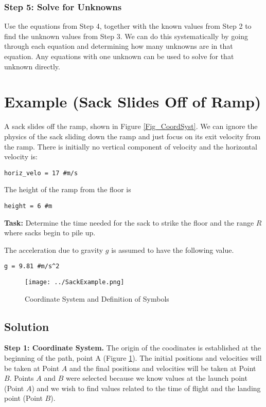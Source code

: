 \documentclass[11pt]{article}
\begin{document}
\subsubsection{Step 5: Solve for Unknowns}
\label{sec-3-4-5}

Use the equations from Step 4, together with the known values from
Step 2 to find the unknown values from Step 3.  We can do this
systematically by going through each equation and determining how many
unknowns are in that equation.  Any equations with one unknown can be
used to solve for that unknown directly.

\section{Example (Sack Slides Off of Ramp)}
\label{sec-4}

A sack slides off the ramp, shown in Figure \ref{Fig_CoordSyst}.  We can
ignore the physics of the sack sliding down the ramp and just focus on
its exit velocity from the ramp.  There is initially no vertical
component of velocity and the horizontal velocity is:

\begin{verbatim}
horiz_velo = 17 #m/s
\end{verbatim}

The height of the ramp from the floor is

\begin{verbatim}
height = 6 #m
\end{verbatim}

\textbf{Task:} Determine the time needed for the sack to strike the floor and
the range $R$ where sacks begin to pile up.

The acceleration due to gravity $g$ is assumed to have the following
value.

\begin{verbatim}
g = 9.81 #m/s^2
\end{verbatim}

\begin{figure}[htb]
\centering
\texttt{[image: ../SackExample.png]}
\caption{\label{Fig_SackExample}Coordinate System and Definition of Symbols}
\end{figure}

\subsection{Solution}
\label{sec-4-1}

\textbf{Step 1: Coordinate System.} The origin of the coodinates is
established at the beginning of the path, point A (Figure
\ref{Fig_SackExample}).  The initial positions and velocities will be taken
at Point $A$ and the final positions and velocities will be taken at
Point $B$.  Points $A$ and $B$ were selected because we know values at
the launch point (Point $A$) and we wish to find values related to the
time of flight and the landing point (Point $B$).
\end{document}

